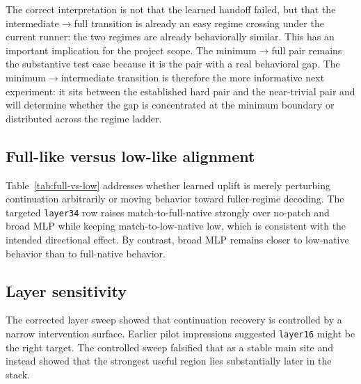 \documentclass[11pt]{article}
\newcommand{\method}[1]{\texttt{#1}}
\begin{document}
The correct interpretation is not that the learned handoff failed, but that the intermediate$\rightarrow$full transition is already an easy regime crossing under the current runner: the two regimes are already behaviorally similar. This has an important implication for the project scope. The minimum$\rightarrow$full pair remains the substantive test case because it is the pair with a real behavioral gap. The minimum$\rightarrow$intermediate transition is therefore the more informative next experiment: it sits between the established hard pair and the near-trivial pair and will determine whether the gap is concentrated at the minimum boundary or distributed across the regime ladder.

\subsection{Full-like versus low-like alignment}
Table~\ref{tab:full-vs-low} addresses whether learned uplift is merely perturbing continuation arbitrarily or moving behavior toward fuller-regime decoding. The targeted \method{layer34} row raises match-to-full-native strongly over no-patch and broad MLP while keeping match-to-low-native low, which is consistent with the intended directional effect. By contrast, broad MLP remains closer to low-native behavior than to full-native behavior.

\begin{table}[H]
    \centering
    \small
    \caption{Next-token behavioral alignment at \method{layer34,last1}: full-native versus low-native.}
    \resizebox{\linewidth}{!}{}
    \label{tab:full-vs-low}
\end{table}

\subsection{Layer sensitivity}
The corrected layer sweep showed that continuation recovery is controlled by a narrow intervention surface. Earlier pilot impressions suggested \method{layer16} might be the right target. The controlled sweep falsified that as a stable main site and instead showed that the strongest useful region lies substantially later in the stack.

\begin{table}[H]
    \centering
    \small
    
    \caption{Summary of the corrected layer sweep. The learned and reference-patch peaks are not uniform across the stack.}
    \label{tab:layersweep}
\end{table}
\end{document}
